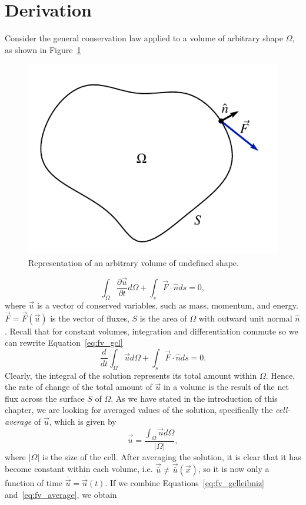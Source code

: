 \section{Derivation}
Consider the general conservation law applied to a volume of arbitrary shape $\Omega$, as shown in Figure~\ref{fig:fv_omega}
\begin{figure}[htbp]
 \centering
 \includegraphics[width=0.4\linewidth]{Pictures/fv_arbitrary_volume}
 \caption{Representation of an arbitrary volume of undefined shape.}
 \label{fig:fv_omega}
\end{figure}
\begin{equation}
 \int_\Omega \frac{\partial \vec u}{\partial t} d \Omega + \int_s \vec F\cdot \hat n ds = 0,
 \label{eq:fv_gcl}
\end{equation}
where $\vec{u}$ is a vector of conserved variables, such as mass, momentum, and energy. $\vec{F}=\vec F(\vec u)$ is the vector of fluxes, $S$ is the area of $\Omega$ with outward unit normal $\hat n$. Recall that for constant volumes, integration and differentiation commute so we can rewrite Equation~\ref{eq:fv_gcl}
\begin{equation}
 \frac{d}{dt} \int_\Omega \vec{u} d\Omega + \int_s \vec F\cdot \hat n ds = 0.
 \label{eq:fv_gclleibniz}
\end{equation}
Clearly, the integral of the solution represents its total amount within $\Omega$. Hence, the rate of change of the total amount of $\vec{u}$ in a volume is the result of the net flux across the surface $S$ of $\Omega$. As we have stated in the introduction of this chapter, we are looking for averaged values of the solution, specifically the \textit{cell-average} of $\vec u$, which is given by
\begin{equation}
 \vec {\overline{u}} = \frac{ \int_\Omega \vec u d\Omega} {|\Omega|},
 \label{eq:fv_average}
\end{equation}
where $|\Omega|$ is the size of the cell. After averaging the solution, it is clear that it has become constant within each volume, i.e. $\vec {\overline u} \neq \vec {\overline u} (\vec x)$, so it is now only a function of time $\overline {\vec u} = \overline {\vec u} (t)$. If we combine Equations~\ref{eq:fv_gclleibniz} and~\ref{eq:fv_average}, we obtain
